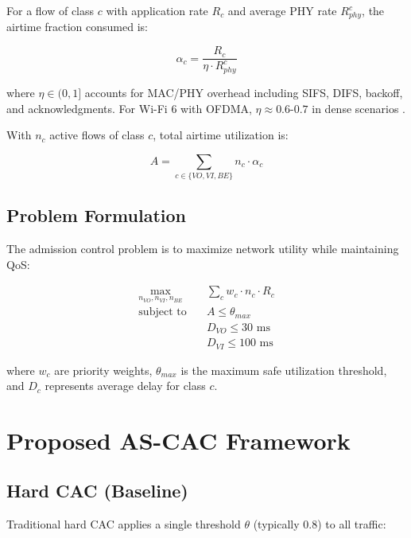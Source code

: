 \documentclass[conference]{IEEEtran}
\begin{document}
For a flow of class $c$ with application rate $R_c$ and average PHY rate $R_{phy}^c$, the airtime fraction consumed is:

\begin{equation}
\alpha_c = \frac{R_c}{\eta \cdot R_{phy}^c}
\label{eq:airtime}
\end{equation}

where $\eta \in (0,1]$ accounts for MAC/PHY overhead including SIFS, DIFS, backoff, and acknowledgments. For Wi-Fi 6 with OFDMA, $\eta \approx 0.6$-$0.7$ in dense scenarios \cite{2}.

With $n_c$ active flows of class $c$, total airtime utilization is:

\begin{equation}
A = \sum_{c \in \{VO, VI, BE\}} n_c \cdot \alpha_c
\label{eq:total_airtime}
\end{equation}

\subsection{Problem Formulation}

The admission control problem is to maximize network utility while maintaining QoS:

\begin{align}
\max_{n_{VO}, n_{VI}, n_{BE}} \quad & \sum_{c} w_c \cdot n_c \cdot R_c \label{eq:objective}\\
\text{subject to} \quad & A \leq \theta_{max} \label{eq:constraint1}\\
& D_{VO} \leq 30 \text{ ms} \label{eq:constraint2}\\
& D_{VI} \leq 100 \text{ ms} \label{eq:constraint3}
\end{align}

where $w_c$ are priority weights, $\theta_{max}$ is the maximum safe utilization threshold, and $D_c$ represents average delay for class $c$.

\section{Proposed AS-CAC Framework}

\subsection{Hard CAC (Baseline)}

Traditional hard CAC applies a single threshold $\theta$ (typically 0.8) to all traffic:
\end{document}
